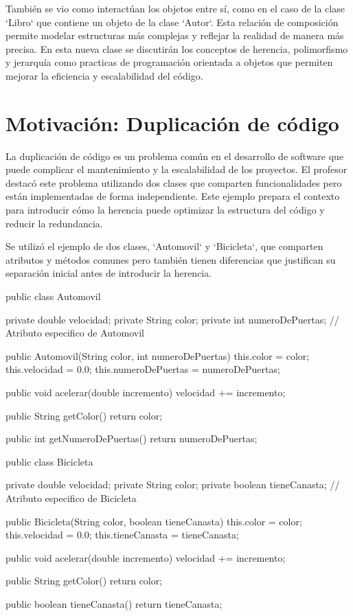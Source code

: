 \documentclass[a4paper]{report}
\begin{document}
También se vio como interactúan los objetos entre sí, como en el caso de la clase `Libro` que contiene un objeto de la clase `Autor`. Esta relación de composición permite modelar estructuras más complejas y reflejar la realidad de manera más precisa. En esta nueva clase se discutirán los conceptos de herencia, polimorfismo y jerarquía como practicas de programación orientada a objetos que permiten mejorar la eficiencia y escalabilidad del código.


\section{Motivación: Duplicación de código}
La duplicación de código es un problema común en el desarrollo de software que puede complicar el mantenimiento y la escalabilidad de los proyectos. El profesor destacó este problema utilizando dos clases que comparten funcionalidades pero están implementadas de forma independiente. Este ejemplo prepara el contexto para introducir cómo la herencia puede optimizar la estructura del código y reducir la redundancia.

Se utilizó el ejemplo de dos clases, `Automovil` y `Bicicleta`, que comparten atributos y métodos comunes pero también tienen diferencias que justifican su separación inicial antes de introducir la herencia.

\begin{roundedlst}
public class Automovil {
    private double velocidad;
    private String color;
    private int numeroDePuertas;  
    // Atributo especifico de Automovil

    public Automovil(String color, int numeroDePuertas) {
        this.color = color;
        this.velocidad = 0.0;
        this.numeroDePuertas = numeroDePuertas;
    }

    public void acelerar(double incremento) {
        velocidad += incremento;
    }

    public String getColor() {
        return color;
    }

    public int getNumeroDePuertas() {
        return numeroDePuertas;
    }
}

public class Bicicleta {
    private double velocidad;
    private String color;
    private boolean tieneCanasta;  
    // Atributo especifico de Bicicleta

    public Bicicleta(String color, boolean tieneCanasta) {
        this.color = color;
        this.velocidad = 0.0;
        this.tieneCanasta = tieneCanasta;
    }

    public void acelerar(double incremento) {
        velocidad += incremento;
    }

    public String getColor() {
        return color;
    }

    public boolean tieneCanasta() {
        return tieneCanasta;
    }
}
\end{roundedlst}
\end{document}
